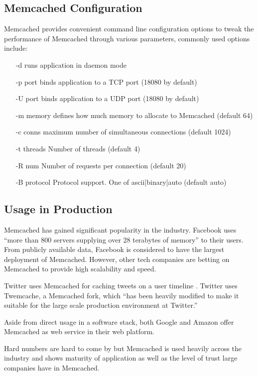 \subsection{Memcached Configuration}
\label{sec:memcached_configuration}
Memcached provides convenient command line configuration options to tweak the performance of Memcached through various parameters, commonly used options include:
\begin{itemize}
    \item [-d] runs application in daemon mode
    \item [-p port] binds application to a TCP port (18080 by default)
    \item [-U port] binds application to a UDP port (18080 by default)
    \item [-m memory] defines how much memory to allocate to Memcached (default 64)
    \item [-c conns] maximum number of simultaneous connections (default 1024)
    \item [-t threads] Number of threads (default 4)
    \item [-R num] Number of requests per connection (default 20)
    \item [-B protocol] Protocol support. One of ascii|binary|auto (default auto)
\end{itemize}

\subsection{Usage in Production}
Memcached has gained significant popularity in the industry. Facebook uses ``more than 800 servers supplying over 28 terabytes of memory'' \cite{scalingMemcachedAtFacebook} to their users. From publicly available data, Facebook is considered to have the largest deployment of Memcached. However, other tech companies are betting on Memcached to provide high scalability and speed.

Twitter uses Memcached for caching tweets on a user timeline \cite{twitterMemcached}. Twitter uses Twemcache, a Memcached fork, which ``has been heavily modified to make it suitable for the large scale production environment at Twitter.'' \cite{twemcache}

Aside from direct usage in a software stack, both Google \cite{googleCloudMemache} and Amazon \cite{awsMemcached} offer Memcached as web service in their web platform.

Hard numbers are hard to come by but Memcached is used heavily across the industry and shows maturity of application as well as the level of trust large companies have in Memcached.


